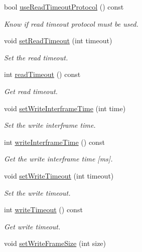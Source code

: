 \begin{DoxyCompactItemize}
bool \hyperlink{classmdt_port_config_ad90a88b06f0efebd1ee9f6d4370dec33}{use\-Read\-Timeout\-Protocol} () const 
\begin{DoxyCompactList}\small\item\em Know if read timeout protocol must be used. \end{DoxyCompactList}\item 
void \hyperlink{classmdt_port_config_a1028f6c9d7073a6591fa59fc907f0585}{set\-Read\-Timeout} (int timeout)
\begin{DoxyCompactList}\small\item\em Set the read timeout. \end{DoxyCompactList}\item 
int \hyperlink{classmdt_port_config_ab18c2ec1628cb480a70033387e7c3333}{read\-Timeout} () const 
\begin{DoxyCompactList}\small\item\em Get read timeout. \end{DoxyCompactList}\item 
void \hyperlink{classmdt_port_config_a7113f6d96e93978cc3915589c14b16b6}{set\-Write\-Interframe\-Time} (int time)
\begin{DoxyCompactList}\small\item\em Set the write interframe time. \end{DoxyCompactList}\item 
int \hyperlink{classmdt_port_config_a745f5111436fc143b75440bf90a1a4e6}{write\-Interframe\-Time} () const 
\begin{DoxyCompactList}\small\item\em Get the write interframe time \mbox{[}ms\mbox{]}. \end{DoxyCompactList}\item 
void \hyperlink{classmdt_port_config_ac117f7cd1f23de163a7fe84f69c2164c}{set\-Write\-Timeout} (int timeout)
\begin{DoxyCompactList}\small\item\em Set the write timeout. \end{DoxyCompactList}\item 
int \hyperlink{classmdt_port_config_a3009e07cd66f4c4bfc1c7fdabbc9f93c}{write\-Timeout} () const 
\begin{DoxyCompactList}\small\item\em Get write timeout. \end{DoxyCompactList}\item 
void \hyperlink{classmdt_port_config_a9539cef9e33d564c7c70902a6380be04}{set\-Write\-Frame\-Size} (int size)

\end{DoxyCompactItemize}
